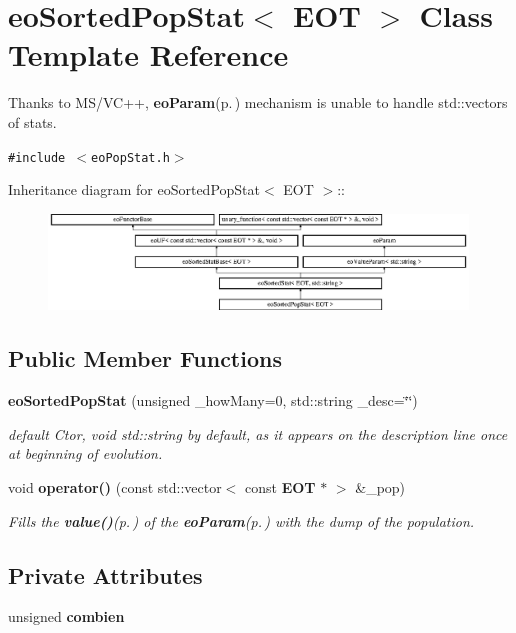 \section{eo\-Sorted\-Pop\-Stat$<$ EOT $>$ Class Template Reference}
\label{classeo_sorted_pop_stat}
Thanks to MS/VC++, {\bf eo\-Param}{\rm (p.\,\pageref{classeo_param})} mechanism is unable to handle std::vectors of stats.  


{\tt \#include $<$eo\-Pop\-Stat.h$>$}

Inheritance diagram for eo\-Sorted\-Pop\-Stat$<$ EOT $>$::\begin{figure}[H]
\begin{center}
\leavevmode
\includegraphics[height=2.55708cm]{classeo_sorted_pop_stat}
\end{center}
\end{figure}
\subsection*{Public Member Functions}
\begin{CompactItemize}
\item 
{\bf eo\-Sorted\-Pop\-Stat} (unsigned \_\-how\-Many=0, std::string \_\-desc=\char`\"{}\char`\"{})
\begin{CompactList}\small\item\em default Ctor, void std::string by default, as it appears on the description line once at beginning of evolution. \item\end{CompactList}\item 
void {\bf operator()} (const std::vector$<$ const {\bf EOT} $\ast$ $>$ \&\_\-pop)
\begin{CompactList}\small\item\em Fills the {\bf value()}{\rm (p.\,\pageref{classeo_value_param_a2})} of the {\bf eo\-Param}{\rm (p.\,\pageref{classeo_param})} with the dump of the population. \item\end{CompactList}\end{CompactItemize}
\subsection*{Private Attributes}
\begin{CompactItemize}
\item 
unsigned {\bf combien}\label{classeo_sorted_pop_stat_r0}

\end{CompactItemize}


